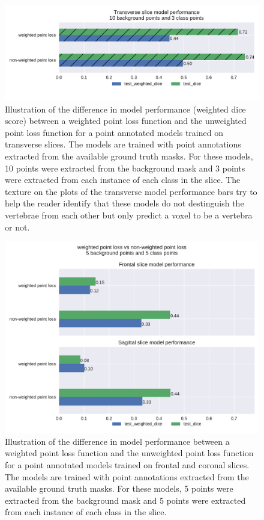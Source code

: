 \begin{samepage}
\begin{figure}
    \centering
    \includegraphics[width=.95\textwidth]{images/weightedvsnonweighted_transverse.pdf}
    \caption{
        Illustration of the difference in model performance (weighted dice score) between a weighted point loss function and the unweighted point loss function for a point annotated models trained on transverse slices.
        The models are trained with point annotations extracted from the available ground truth masks. For these models, 
        10 points were extracted from the background mask and 3 points were extracted from each instance of each class in the slice. 
        The texture on the plots of the transverse model performance bars try to help the reader identify that these models do not destinguish the vertebrae from each other but only predict a voxel to be a vertebra or not.
    \label{fig:weighted_vs_unweighted_transverse}}
\end{figure}\nopagebreak
\begin{figure}
    \centering
    \includegraphics[width=.95\textwidth]{images/weightedvsnonweighted.pdf}
    \caption{
        Illustration of the difference in model performance between a weighted point loss function and the unweighted point loss function for a point annotated models trained on frontal and coronal slices.
        The models are trained with point annotations extracted from the available ground truth masks. For these models, 
        5 points were extracted from the background mask and 5 points were extracted from each instance of each class in the slice. 
        \label{fig:weighted_vs_unweighted}}
\end{figure}
\end{samepage}
